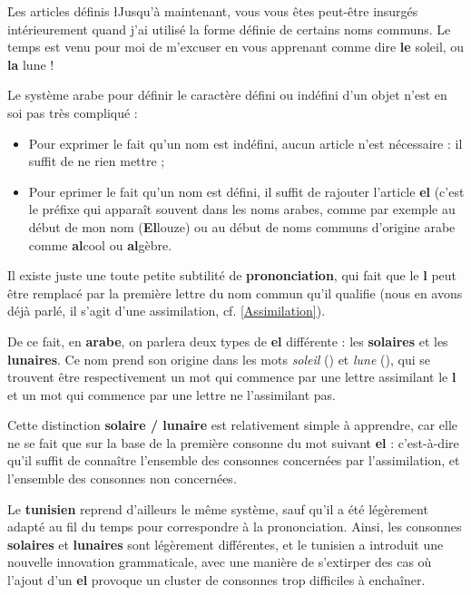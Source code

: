 \h{Les articles définis}
\l{J}usqu'à maintenant, vous vous êtes peut-être insurgés intérieurement quand j'ai utilisé la forme définie de certains noms communs. Le temps est venu pour moi de m'excuser en vous apprenant comme dire \textbf{le} soleil, ou \textbf{la} lune !

Le système arabe pour définir le caractère défini ou indéfini d'un objet n'est en soi pas très compliqué : 
\begin{itemize}
    \item Pour exprimer le fait qu'un nom est indéfini, aucun article n'est nécessaire : il suffit de ne rien mettre ;
    \item Pour eprimer le fait qu'un nom est défini, il suffit de rajouter l'article \textbf{el} (c'est le préfixe qui apparaît souvent dans les noms arabes, comme par exemple au début de mon nom (\textbf{El}louze) ou au début de noms communs d'origine arabe comme \textbf{al}cool ou \textbf{al}gèbre.
\end{itemize}

Il existe juste une toute petite subtilité de \textbf{prononciation}, qui fait que le \textbf{l} peut être remplacé par la première lettre du nom commun qu'il qualifie (nous en avons déjà parlé, il s'agit d'une assimilation, cf. \ref{Assimilation}).

De ce fait, en \textbf{arabe}, on parlera deux types de \textbf{el} différente : les \textbf{solaires} et les \textbf{lunaires}. Ce nom prend son origine dans les mots \textit{soleil} () et \textit{lune} (), qui se trouvent être respectivement un mot qui commence par une lettre assimilant le \textbf{l} et un mot qui commence par une lettre ne l'assimilant pas.

Cette distinction \textbf{solaire / lunaire} est relativement simple à apprendre, car elle ne se fait que sur la base de la première consonne du mot suivant \textbf{el} : c'est-à-dire qu'il suffit de connaître l'ensemble des consonnes concernées par l'assimilation, et l'ensemble des consonnes non concernées.

Le \textbf{tunisien} reprend d'ailleurs le même système, sauf qu'il a été légèrement adapté au fil du temps pour correspondre à la prononciation. Ainsi, les consonnes \textbf{solaires} et \textbf{lunaires} sont légèrement différentes, et le tunisien a introduit une nouvelle innovation grammaticale, avec une manière de s'extirper des cas où l'ajout d'un \textbf{el} provoque un cluster de consonnes trop difficiles à enchaîner.

